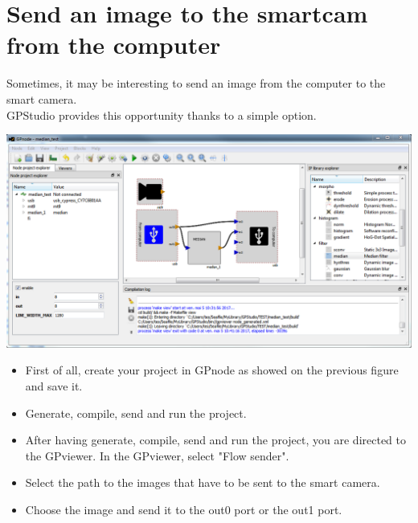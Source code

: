\documentclass[12pt,a4paper]{article}
\begin{document}
\tableofcontents

\newpage

\section{Send an image to the smartcam from the computer}

Sometimes, it may be interesting to send an image from the computer to the smart camera.\\

GPStudio provides this opportunity thanks to a simple option.\\

\vspace{0.5cm}

\begin{center}
\includegraphics[width=\textwidth]{FC1.png}
\end{center}

\vspace{1cm}

\begin{itemize}
\item First of all, create your project in GPnode as showed on the previous figure and save it.\\ 
\item Generate, compile, send and run the project. \\ 
\item After having generate, compile, send and run the project, you are directed to the GPviewer. In the GPviewer, select "Flow sender".\\ 
\item Select the path to the images that have to be sent to the smart camera.\\
\item Choose the image and send it to the out0 port or the out1 port.  
\end{itemize}
\end{document}
